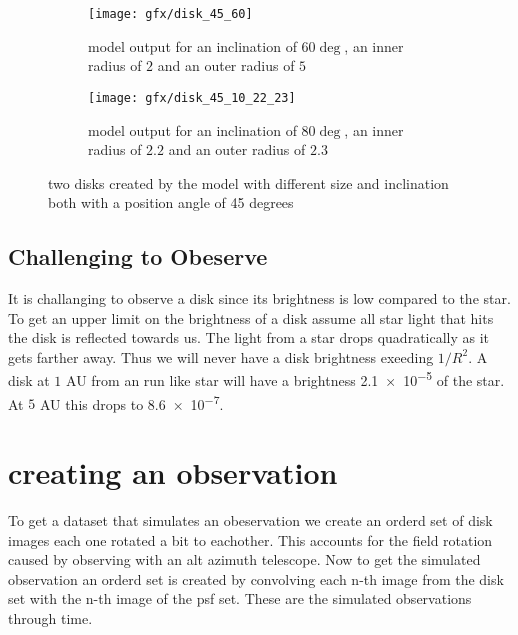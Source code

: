 \begin{figure}[h!]
  \begin{subfigure}[b]{0.5\textwidth}
    \texttt{[image: gfx/disk\_45\_60]}
    \caption{model output for an inclination of $60\deg$, an inner radius of $2$ and an outer radius of $5$}
  \end{subfigure}
  \begin{subfigure}[b]{0.5\textwidth}
    \texttt{[image: gfx/disk\_45\_10\_22\_23]}
    \caption{model output for an inclination of $80\deg$, an inner radius of $2.2$ and an outer radius of $2.3$}
  \end{subfigure}
  \caption{two disks created by the model with different size and inclination both with a position angle of 45 degrees}
  \label{fig:disk}
\end{figure}







\subsection{Challenging to Obeserve}

It is challanging to observe a disk since its brightness is low compared to the star. To get an upper limit on the brightness of a disk assume all star light that hits the disk is reflected towards us. The light from a star drops quadratically as it gets farther away. Thus we will never have a disk brightness exeeding $1/R^2$. A disk at $1$ AU from an run like star will have a brightness \num{2.1e-5} of the star. At $5$ AU this drops to \num{8.6e-7}. 






\section{creating an observation}

To get a dataset that simulates an obeservation we create an orderd set of disk images each one rotated a bit to eachother. This accounts for the field rotation caused by observing with an alt azimuth telescope. Now to get the simulated observation an orderd set is created by convolving each n-th image from the disk set with the n-th image of the psf set. These are the simulated observations through time. 

